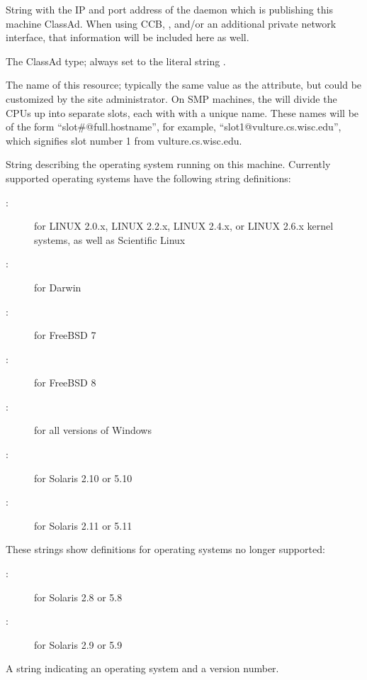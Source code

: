 \begin{description}
\item[\AdAttr{MyAddress}:] String with the IP and port address of the
 daemon which is publishing this machine ClassAd.
When using CCB, , and/or an additional private
network interface, that information will be included here as well.

\item[\AdAttr{MyType}:] The ClassAd type; always set to the literal string .
%
\item[\AdAttr{Name}:] The name of this resource; typically the same value as
the  attribute, but could be customized by the site
administrator.
On SMP machines, the  will divide the CPUs up into separate
slots, each with with a unique name.
These names will be of the form ``slot\#@full.hostname'', for example,
``slot1@vulture.cs.wisc.edu'', which signifies slot number 1 from
vulture.cs.wisc.edu.
%
\item[\AdAttr{OpSys}:] String describing the operating system running on this
machine.  
Currently supported operating systems have the following string
definitions:
	\begin{description}
	\item[:] for LINUX 2.0.x, LINUX 2.2.x,
	LINUX 2.4.x, or LINUX 2.6.x kernel systems, as well as Scientific Linux 
	\item[:] for Darwin
	\item[:] for FreeBSD 7
	\item[:] for FreeBSD 8
	\item[:] for all versions of Windows
	\item[:] for Solaris 2.10 or 5.10
	\item[:] for Solaris 2.11 or 5.11
	\end{description}
These strings show definitions for operating systems no longer supported:
	\begin{description}
	\item[:] for Solaris 2.8 or 5.8
	\item[:] for Solaris 2.9 or 5.9
	\end{description}
%
\item[\AdAttr{OpSysAndVer}:] A string indicating an operating system and
a version number.


\end{description}
